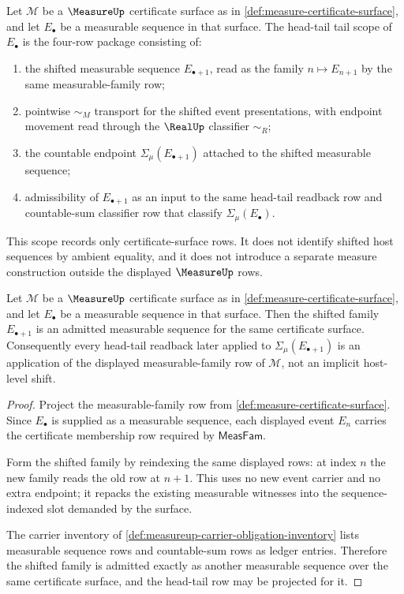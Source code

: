 \begin{definition}
\label{def:measure-head-tail-tail-scope}
Let $\mathcal{M}$ be a $\MeasureUp$ certificate surface as in
\autoref{def:measure-certificate-surface}, and let $E_\bullet$ be a measurable
sequence in that surface. The head-tail tail scope of $E_\bullet$ is the
four-row package consisting of:
\begin{enumerate}
  \item the shifted measurable sequence $E_{\bullet+1}$, read as the family
  $n\mapsto E_{n+1}$ by the same measurable-family row;
  \item pointwise $\sim_M$ transport for the shifted event presentations, with
  endpoint movement read through the $\RealUp$ classifier $\sim_R$;
  \item the countable endpoint $\Sigma_\mu(E_{\bullet+1})$ attached to the
  shifted measurable sequence;
  \item admissibility of $E_{\bullet+1}$ as an input to the same head-tail
  readback row and countable-sum classifier row that classify
  $\Sigma_\mu(E_\bullet)$.
\end{enumerate}
This scope records only certificate-surface rows. It does not identify shifted
host sequences by ambient equality, and it does not introduce a separate
measure construction outside the displayed $\MeasureUp$ rows.
\end{definition}

\begin{theorem}
\label{thm:measure-head-tail-tail-measurable-sequence-scope}
Let $\mathcal{M}$ be a $\MeasureUp$ certificate surface as in
\autoref{def:measure-certificate-surface}, and let $E_\bullet$ be a measurable
sequence in that surface. Then the shifted family $E_{\bullet+1}$ is an
admitted measurable sequence for the same certificate surface. Consequently
every head-tail readback later applied to $\Sigma_\mu(E_{\bullet+1})$ is an
application of the displayed measurable-family row of $\mathcal{M}$, not an
implicit host-level shift.
\end{theorem}
\begin{proof}
Project the measurable-family row from
\autoref{def:measure-certificate-surface}. Since $E_\bullet$ is supplied as a
measurable sequence, each displayed event $E_n$ carries the certificate
membership row required by $\mathsf{MeasFam}$.

Form the shifted family by reindexing the same displayed rows: at index $n$ the
new family reads the old row at $n+1$. This uses no new event carrier and no
extra endpoint; it repacks the existing measurable witnesses into the
sequence-indexed slot demanded by the surface.

The carrier inventory of
\autoref{def:measureup-carrier-obligation-inventory} lists measurable sequence
rows and countable-sum rows as ledger entries. Therefore the shifted family is
admitted exactly as another measurable sequence over the same certificate
surface, and the head-tail row may be projected for it.
\end{proof}

